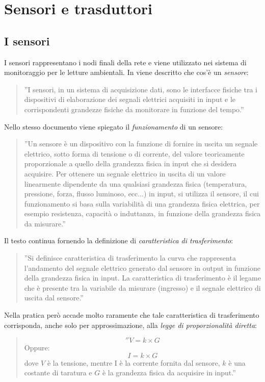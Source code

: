 \documentclass[a4paper]{report} %
\begin{document}
\section{Sensori e trasduttori}
\subsection{I sensori}
I sensori rappresentano i nodi finali della rete e viene utilizzato nei sistema di monitoraggio per le letture ambientali.
In \cite{art:rif.1} viene descritto che cos'è un \textit{sensore}:
\begin{quote}
	''I sensori, in un sistema di acquisizione dati, sono le interfacce fisiche tra i dispositivi di elaborazione dei segnali elettrici acquisiti in input e le corrispondenti grandezze fisiche da monitorare in funzione del tempo.''
\end{quote} 
Nello stesso documento viene spiegato il \textit{funzionamento} di un sensore:
\begin{quote}
	''Un sensore è un dispositivo con la funzione di fornire in uscita un segnale elettrico, sotto forma di tensione o di corrente, del valore teoricamente proporzionale a quello della grandezza fisica in input che si desidera acquisire. 	
	Per ottenere un segnale elettrico in uscita di un valore linearmente dipendente da una qualsiasi grandezza fisica (temperatura, pressione, forza, flusso luminoso, ecc...) in input, si utilizza il sensore, il cui funzionamento si basa sulla variabilità di una grandezza fisica elettrica, per esempio resistenza, capacità o induttanza, in funzione della grandezza fisica da misurare.''
\end{quote}
Il testo continua fornendo la definizione di \textit{caratteristica di trasferimento}:	
\begin{quote}
	''Si definisce caratteristica di trasferimento la curva che rappresenta l'andamento del segnale elettrico generato dal sensore in output in funzione della grandezza fisica in input.
	La caratteristica di trasferimento è il legame che è presente tra la variabile da misurare (ingresso) e il segnale elettrico di uscita dal sensore.''
\end{quote}
Nella pratica però accade molto raramente che tale caratteristica di trasferimento corrisponda, anche solo per approssimazione, alla \textit{legge di proporzionalità diretta}: 
\begin{quote}
	\begin{equation}
	''V = k \times G
	\end{equation}
	Oppure:
	\begin{equation}
	I = k \times G
	\end{equation}
	dove $V$ è la tensione, mentre I è la corrente fornita dal sensore, $k$ è una costante di taratura e $G$ è la grandezza fisica da acquisire in input.'' 
\end{quote} 
\end{document}
